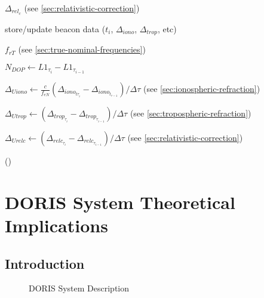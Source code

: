 \begin{algorithm}
{{{{        
        $\Delta_{{rel}_c}$ (see \ref{sec:relativistic-correction})

        {
          store/update beacon data ($t_i$, $\Delta_{iono}$, $\Delta_{trop}$, etc)
        }
        {
          $f_{rT}$ (see \ref{sec:true-nominal-frequencies})

          $N_{DOP} \gets L1_{\tau_i} - L1_{\tau_{i-1}}$

          $\Delta_{Uiono} \gets \frac{c}{f_{eN}} ( \Delta_{iono_{t\tau_i}} - \Delta_{iono_{t_{\tau-1}}} ) / \Delta \tau$ (see \ref{sec:ionospheric-refraction})

          $\Delta_{Utrop} \gets ( \Delta_{trop_{\tau_i}} - \Delta_{trop_{\tau_{i-1}}} ) / \Delta \tau$ (see \ref{sec:tropospheric-refraction})

          $\Delta_{Urelc} \gets ( \Delta_{relc_{\tau_i}} - \Delta_{relc_{\tau_{i-1}}} ) / \Delta \tau$ (see \ref{sec:relativistic-correction})

          \see ()

        }
      }
    }
  }
}

\end{algorithm}


\chapter{DORIS System Theoretical Implications}
\label{ch:doris-theory}

\section{Introduction}
\label{sec:doris-introduction}

\begin{figure}
\centering

\caption{DORIS System Description}
\label{fig:doris-system-description}
\end{figure}

